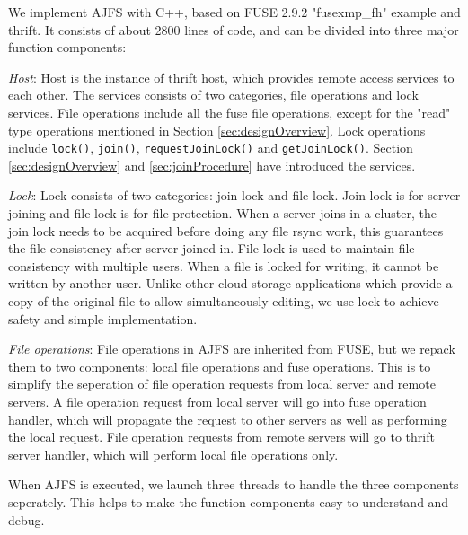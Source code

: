 We implement AJFS with C++, based on FUSE 2.9.2 "fusexmp\_fh" example and thrift. It consists of about 2800 lines of code, and can be divided into three major function components:

\emph{Host}: Host is the instance of thrift host, which provides remote access services to each other. The services consists of two categories, file operations and lock services. File operations include all the fuse file operations, except for the "read" type operations mentioned in Section \ref{sec:designOverview}. Lock operations include \texttt{lock()}, \texttt{join()}, \texttt{requestJoinLock()} and \texttt{getJoinLock()}. Section \ref{sec:designOverview} and \ref{sec:joinProcedure} have introduced the services.

\emph{Lock}: Lock consists of two categories: join lock and file lock. Join lock is for server joining and file lock is for file protection. When a server joins in a cluster, the join lock needs to be acquired before doing any file rsync work, this guarantees the file consistency after server joined in. File lock is used to maintain file consistency with multiple users. When a file is locked for writing, it cannot be written by another user. Unlike other cloud storage applications which provide a copy of the original file to allow simultaneously editing, we use lock to achieve safety and simple implementation.

\emph{File operations}: File operations in AJFS are inherited from FUSE, but we repack them to two components: local file operations and fuse operations. This is to simplify the seperation of file operation requests from local server and remote servers. A file operation request from local server will go into fuse operation handler, which will propagate the request to other servers as well as performing the local request. File operation requests from remote servers will go to thrift server handler, which will perform local file operations only.

When AJFS is executed, we launch three threads to handle the three components seperately. This helps to make the function components easy to understand and debug.
